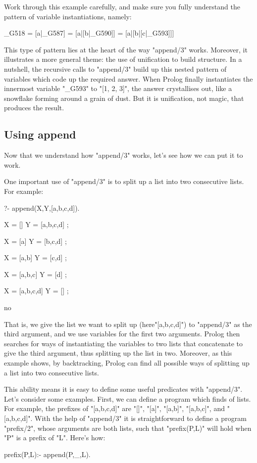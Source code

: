Work through this example carefully, and make sure you fully
understand the pattern of variable instantiations, namely:
\begin{LPNcodedisplay}
_G518 = [a|_G587]
      = [a|[b|_G590]]
      = [a|[b|[c|_G593]]]
\end{LPNcodedisplay}
This type of pattern lies at the heart of the way "append/3" works.
Moreover, it illustrates a more general theme: the use of unification to
build structure. In a nutshell, the recursive calls to "append/3" build up
this nested pattern of variables which code up the required
answer. When Prolog finally instantiates the innermost variable
"_G593" to "[1, 2, 3]", the answer crystallises out, like a snowflake
forming around a grain of dust. But it is unification, not magic, that
produces the result.



\subsection*{Using append}\label{SUBSEC.L6.USING.APPEND}



Now that we understand how "append/3" works,
let's see how we can put it to work.

One important use of "append/3" is to split up a list into two
consecutive lists.  For example:
\begin{LPNcodedisplay}
?- append(X,Y,[a,b,c,d]).

X = []
Y = [a,b,c,d] ;

X = [a]
Y = [b,c,d] ;

X = [a,b]
Y = [c,d] ;

X = [a,b,c]
Y = [d] ;

X = [a,b,c,d]
Y = [] ;

no
\end{LPNcodedisplay}

That is, we give the list we want to split up (here"[a,b,c,d]")
to "append/3" as the third argument, and we use variables for the
first two arguments.  Prolog then searches for ways of instantiating
the variables to two lists that concatenate to give the third
argument, thus splitting up the list in two. Moreover, as this example
shows, by backtracking, Prolog can find all possible ways of splitting
up a list into two consecutive lists.

This ability means it is easy to define some useful predicates with
"append/3".  Let's consider some examples.  First, we can define a
program which finds  of lists.  For example, the
prefixes of "[a,b,c,d]" are "[]", "[a]", "[a,b]",
"[a,b,c]", and "[a,b,c,d]".  With the help of "append/3"
it is straightforward to define a program "prefix/2", whose
arguments are both lists, such that "prefix(P,L)" will hold when
"P" is a prefix of "L".  Here's how:
\begin{LPNcodedisplay}
prefix(P,L):- append(P,_,L).
\end{LPNcodedisplay}


